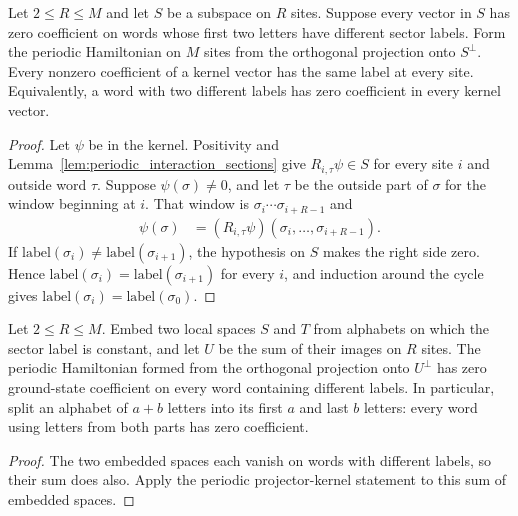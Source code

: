 \begin{lemma}
    \label{lem:physical_sector_projector_kernel_support}
    \leanok
    Let $2\le R\le M$ and let $S$ be a subspace on $R$ sites. Suppose
    every vector in $S$ has zero coefficient on words whose first two
    letters have different sector labels. Form the periodic Hamiltonian
    on $M$ sites from the orthogonal projection onto $S^{\perp}$.
    Every nonzero coefficient of a kernel vector has the same label at
    every site. Equivalently, a word with two different labels has zero
    coefficient in every kernel vector.
\end{lemma}
\begin{proof}
    \leanok
    Let $\psi$ be in the kernel. Positivity and
    Lemma~\ref{lem:periodic_interaction_sections} give
    $R_{i,\tau}\psi\in S$ for every site $i$ and outside word $\tau$.
    Suppose $\psi(\sigma)\ne0$, and let $\tau$ be the outside part of
    $\sigma$ for the window beginning at $i$. That window is
    $\sigma_i\cdots\sigma_{i+R-1}$ and
    \begin{align}
        \psi(\sigma) & =(R_{i,\tau}\psi)(\sigma_i,\ldots,\sigma_{i+R-1}).
    \end{align}
    If $\mathrm{label}(\sigma_i)\ne\mathrm{label}(\sigma_{i+1})$, the
    hypothesis on $S$ makes the right side zero. Hence
    $\mathrm{label}(\sigma_i)=\mathrm{label}(\sigma_{i+1})$ for every $i$,
    and induction around the cycle gives
    $\mathrm{label}(\sigma_i)=\mathrm{label}(\sigma_0)$.
\end{proof}

\begin{lemma}
    \label{lem:two_physical_sector_projector_kernel}
    \leanok
    Let $2\le R\le M$. Embed two local spaces $S$ and $T$ from alphabets
    on which the sector label is constant, and let $U$ be the sum of their
    images on $R$ sites. The periodic Hamiltonian formed from the
    orthogonal projection onto $U^{\perp}$ has zero ground-state coefficient
    on every word containing different labels. In particular, split an
    alphabet of $a+b$ letters into its first $a$ and last $b$ letters:
    every word using letters from both parts has zero coefficient.
\end{lemma}
\begin{proof}
    \leanok
    The two embedded spaces each vanish on words with different labels,
    so their sum does also. Apply the periodic projector-kernel statement
    to this sum of embedded spaces.
\end{proof}

